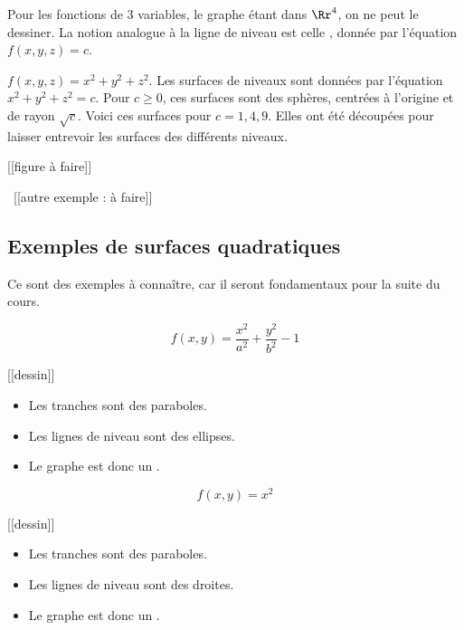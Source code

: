 \documentclass[12pt, class=report,crop=false]{standalone}
\begin{document}
 
 
\bigskip


Pour les fonctions de $3$ variables, le graphe étant dans $\Rr^4$, on ne peut le dessiner. 
La notion analogue à la ligne de niveau est celle , donnée par l'équation $f(x,y,z)=c$.


\begin{exemple}
$f(x,y,z) = x^2+y^2+z^2$. Les surfaces de niveaux sont données par l'équation $x^2+y^2+z^2=c$. 
Pour $c \ge 0$, ces surfaces sont des sphères, centrées à l'origine et de rayon $\sqrt{c}$. 
Voici ces surfaces pour $c=1,4,9$. Elles ont été découpées pour laisser entrevoir les surfaces des différents niveaux.

[[figure à faire]]

\end{exemple}


\begin{exemple}

~[[autre exemple : à faire]]

\end{exemple}


\subsection{Exemples de surfaces quadratiques}

Ce sont des exemples à connaître, car il seront fondamentaux pour la suite du cours.

\begin{exemple}
$$f(x,y) = \frac{x^2}{a^2} + \frac{y^2}{b^2}-1$$

[[dessin]]

\begin{itemize}
  \item Les tranches sont des paraboles.
  \item Les lignes de niveau sont des ellipses.
  \item Le graphe est donc un .
\end{itemize}

\end{exemple}


\begin{exemple}
$$f(x,y) = x^2$$

[[dessin]]

\begin{itemize}
  \item Les tranches sont des paraboles.
  \item Les lignes de niveau sont des droites.
  \item Le graphe est donc un .
\end{itemize}

\end{exemple}
\end{document}
